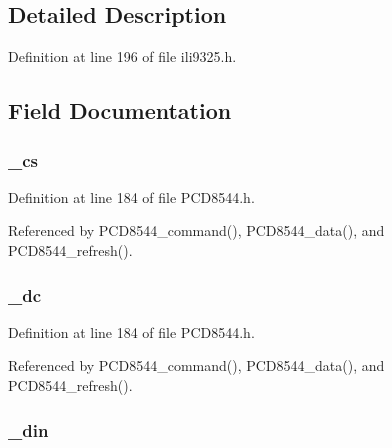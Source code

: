 \subsection{Detailed Description}


Definition at line 196 of file ili9325.\-h.



\subsection{Field Documentation}
\hypertarget{structlcd__t_a2756566f95a83c4536681f348b552787}{
\subsubsection[{\-\_\-cs}]{ \-\_\-cs}}\label{structlcd__t_a2756566f95a83c4536681f348b552787}


Definition at line 184 of file P\-C\-D8544.\-h.



Referenced by P\-C\-D8544\-\_\-command(), P\-C\-D8544\-\_\-data(), and P\-C\-D8544\-\_\-refresh().

\hypertarget{structlcd__t_adf10cf9d52f9a336b72a4465b4665cf4}{
\subsubsection[{\-\_\-dc}]{ \-\_\-dc}}\label{structlcd__t_adf10cf9d52f9a336b72a4465b4665cf4}


Definition at line 184 of file P\-C\-D8544.\-h.



Referenced by P\-C\-D8544\-\_\-command(), P\-C\-D8544\-\_\-data(), and P\-C\-D8544\-\_\-refresh().

\hypertarget{structlcd__t_a7c3db95b39144d3fc60192e2f08beb29}{
\subsubsection[{\-\_\-din}]{ \-\_\-din}}\label{structlcd__t_a7c3db95b39144d3fc60192e2f08beb29}


